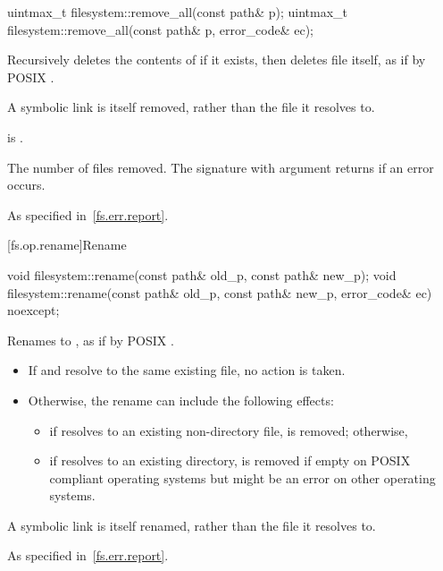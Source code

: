 %
\begin{itemdecl}
uintmax_t filesystem::remove_all(const path& p);
uintmax_t filesystem::remove_all(const path& p, error_code& ec);
\end{itemdecl}

\begin{itemdescr}
\pnum
\effects
Recursively deletes the contents of  if it exists,
  then deletes file  itself, as if by POSIX .
\begin{note}
A symbolic link is itself removed, rather than the file it
  resolves to.
\end{note}

\pnum
\ensures
{} is .

\pnum
\returns
The number of files removed. The signature with argument
   returns  if an error
  occurs.

\pnum
\throws
As specified in~\ref{fs.err.report}.
\end{itemdescr}


[fs.op.rename]{Rename}

%
\begin{itemdecl}
void filesystem::rename(const path& old_p, const path& new_p);
void filesystem::rename(const path& old_p, const path& new_p, error_code& ec) noexcept;
\end{itemdecl}

\begin{itemdescr}
\pnum
\effects
Renames  to , as if by
  POSIX .

\begin{note}
\begin{itemize}
\item If  and  resolve to the same existing file,
   no action is taken.
\item Otherwise, the rename can include the following effects:
\begin{itemize}
\item if  resolves to an existing non-directory file,
     is removed; otherwise,
\item if  resolves to an existing directory,
     is removed if empty on POSIX compliant operating systems
    but might be an error on other operating systems.
\end{itemize}
\end{itemize}
A symbolic link is itself renamed, rather than the file it resolves to.
\end{note}

\pnum
\throws
As specified in~\ref{fs.err.report}.
\end{itemdescr}


